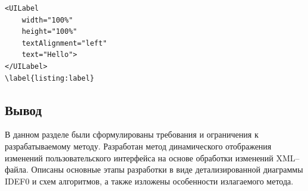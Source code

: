 \begin{lstlisting}[caption={Разметка XML--файла для UILabel}]
<UILabel
    width="100%"
    height="100%"
    textAlignment="left"
    text="Hello">
</UILabel>
\label{listing:label}
\end{lstlisting}




\subsection{Вывод}

В данном разделе были сформулированы требования и ограничения к разрабатываемому методу. 
Разработан метод динамического отображения изменений пользовательского интерфейса на основе обработки изменений XML--файла.
Описаны основные этапы разработки в виде детализированной диаграммы IDEF0 и схем алгоритмов, а также изложены особенности излагаемого метода. 

\pagebreak
